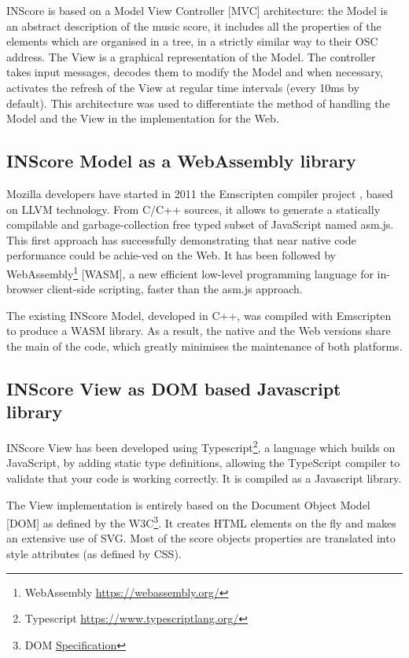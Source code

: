 \documentclass{article}
\begin{document}
INScore is based on a Model View Controller [MVC] architecture: the Model is an abstract description of the music score, it includes all the properties of the elements which are organised in a tree, in a strictly similar way to their OSC address. The View is a graphical representation of the Model.
The controller takes input messages, decodes them to modify the Model and when necessary, activates the refresh of the View at regular time intervals (every 10ms by default).
This architecture was used to differentiate the method of handling the Model and the View in the implementation for the Web.

\subsection{INScore Model as a WebAssembly library}

Mozilla developers have started in 2011 the Emscripten compiler project \cite{10.1145/2048147.2048224}, based on LLVM technology. From C/C++ sources, it allows to generate a statically compilable and garbage-collection free typed subset of JavaScript named asm.js. This first approach has successfully demonstrating that near native code performance could be achie-ved on the Web. It has been followed by WebAssembly\footnote{WebAssembly \url{https://webassembly.org/}} [WASM], a new efficient low-level programming language for in-browser client-side scripting, faster than the asm.js approach.

The existing INScore Model, developed in C++, was compiled with Emscripten to produce a WASM library. 
As a result, the native and the Web versions share the main of the code, which greatly minimises the maintenance of both platforms.

\subsection{INScore View as DOM based Javascript library}

INScore View has been developed using Typescript\footnote{Typescript \url{https://www.typescriptlang.org/}}, a language which builds on JavaScript, by adding static type definitions, allowing the TypeScript compiler to validate that your code is working correctly. It is compiled as a Javascript library.

The View implementation is entirely based on the Document Object Model [DOM] as defined by the W3C\footnote{DOM \href{https://www.w3.org/TR/2000/WD-DOM-Level-1-20000929/DOM.pdf}{Specification}}. It creates HTML elements on the fly and makes an extensive use of SVG. Most of the score objects properties are translated into style attributes (as defined by CSS).
\end{document}
